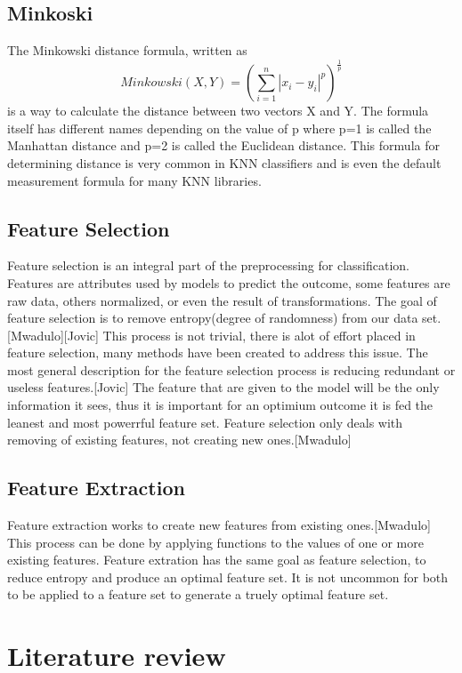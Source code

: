 \documentclass[confrence]{IEEEtran}
\begin{document}
\subsection*{Minkoski}
The Minkowski distance formula, written as \[ Minkowski(X,Y) = (\sum_{i=1}^n|x_i-y_i|^p)^\frac{1}{p}\] is a way to calculate the distance between two vectors X and Y. 
The formula itself has different names depending on the value of p where p=1 is called the Manhattan distance and p=2 is called the Euclidean distance. 
This formula for determining distance is very common in KNN classifiers and is even the default measurement formula for many KNN libraries. 
\subsection*{Feature Selection}
Feature selection is an integral part of the preprocessing for classification. 
Features are attributes used by models to predict the outcome, some features are raw data, others normalized, or even the result of transformations.
The goal of feature selection is to remove entropy(degree of randomness) from our data set.[Mwadulo][Jovic]
This process is not trivial, there is alot of effort placed in feature selection, many methods have been created to address this issue.
The most general description for the feature selection process is reducing redundant or useless features.[Jovic]
The feature that are given to the model will be the only information it sees, thus it is important for an optimium outcome it is fed the leanest and most powerrful feature set.
Feature selection only deals with removing of existing features, not creating new ones.[Mwadulo]
\subsection*{Feature Extraction}
Feature extraction works to create new features from existing ones.[Mwadulo]
This process can be done by applying functions to the values of one or more existing features.
Feature extration has the same goal as feature selection, to reduce entropy and produce an optimal feature set.
It is not uncommon for both to be applied to a feature set to generate a truely optimal feature set.
\section*{Literature review}
\end{document}
